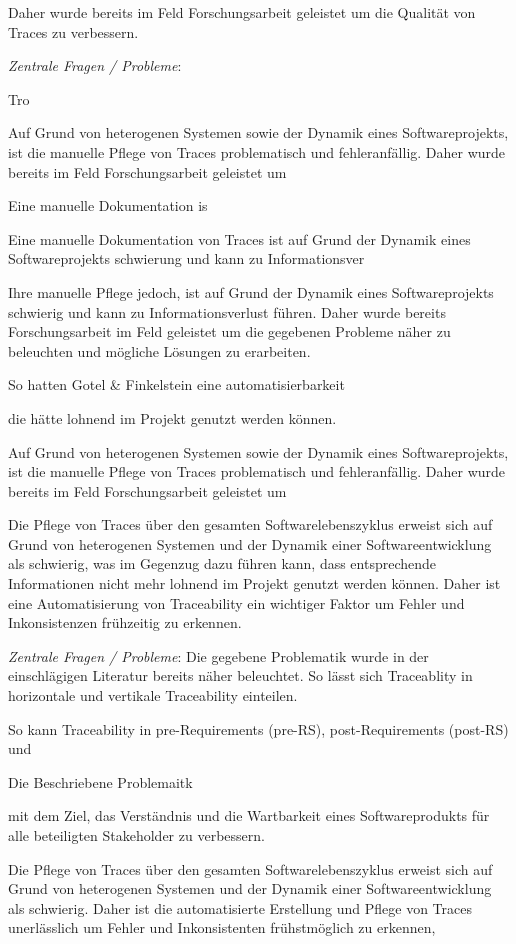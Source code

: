 Daher wurde bereits im Feld Forschungsarbeit geleistet um die Qualität von Traces zu verbessern.

\textit{Zentrale Fragen / Probleme}:


Tro

Auf Grund von heterogenen Systemen sowie der Dynamik eines Softwareprojekts, ist die manuelle Pflege von Traces problematisch und fehleranfällig. Daher wurde bereits im Feld Forschungsarbeit geleistet um 



Eine manuelle Dokumentation is

Eine manuelle Dokumentation von Traces ist auf Grund der Dynamik eines Softwareprojekts schwierung und kann zu Informationsver

Ihre manuelle Pflege jedoch, ist auf Grund der Dynamik eines Softwareprojekts schwierig und kann zu Informationsverlust führen. Daher wurde bereits Forschungsarbeit im Feld geleistet um die gegebenen Probleme näher zu beleuchten und mögliche Lösungen zu erarbeiten.

So hatten Gotel & Finkelstein eine automatisierbarkeit 

die  hätte lohnend im Projekt genutzt werden können.

Auf Grund von heterogenen Systemen sowie der Dynamik eines Softwareprojekts, ist die manuelle Pflege von Traces problematisch und fehleranfällig. Daher wurde bereits im Feld Forschungsarbeit geleistet um 

Die Pflege von Traces über den gesamten Softwarelebenszyklus erweist sich auf Grund von heterogenen Systemen und der Dynamik einer Softwareentwicklung als schwierig, was im Gegenzug dazu führen kann, dass entsprechende Informationen nicht mehr lohnend im Projekt genutzt werden können. Daher ist eine Automatisierung von Traceability ein wichtiger Faktor um Fehler und Inkonsistenzen frühzeitig zu erkennen.

\textit{Zentrale Fragen / Probleme}:
Die gegebene Problematik wurde in der einschlägigen Literatur bereits näher beleuchtet. So lässt sich Traceablity in horizontale und vertikale Traceability einteilen. 

So kann Traceability in pre-Requirements (pre-RS), post-Requirements (post-RS) und 

Die Beschriebene Problemaitk


mit dem Ziel, das Verständnis und die Wartbarkeit eines Softwareprodukts für alle beteiligten Stakeholder zu verbessern.

Die Pflege von Traces über den gesamten Softwarelebenszyklus erweist sich auf Grund von heterogenen Systemen und der Dynamik einer Softwareentwicklung als schwierig.  Daher ist die automatisierte Erstellung und Pflege von Traces unerlässlich um Fehler und Inkonsistenten frühstmöglich zu erkennen,

